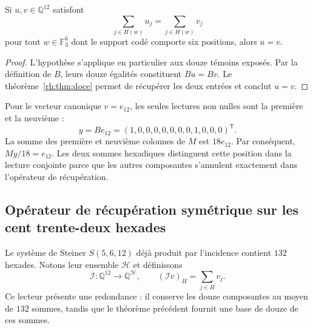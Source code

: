 \begin{corollary}
Si $u,v\in\mathbb Q^{12}$ satisfont
\[
\sum_{j\in H(w)}u_j=\sum_{j\in H(w)}v_j
\]
pour tout $w\in\mathbb F_3^6$ dont le support codé comporte six
positions, alors $u=v$.
\end{corollary}
\begin{proof}
L'hypothèse s'applique en particulier aux douze témoins exposés.
Par la définition de $B$, leurs douze égalités constituent $Bu=Bv$.
Le théorème~\ref{rh:thm:doce} permet de récupérer les deux entrées et
conclut $u=v$.
\end{proof}

\begin{example}
Pour le vecteur canonique $v=e_{12}$, les seules lectures non nulles sont
la première et la neuvième :
\[
y=Be_{12}=(1,0,0,0,0,0,0,0,1,0,0,0)^{\mathsf T}.
\]
La somme des première et neuvième colonnes de $M$ est $18e_{12}$.
Par conséquent, $My/18=e_{12}$. Les deux sommes hexadiques distinguent
cette position dans la lecture conjointe parce que les autres composantes
s'annulent exactement dans l'opérateur de récupération.
\end{example}

\subsection{Opérateur de récupération symétrique sur les cent trente-deux hexades}

Le système de Steiner $S(5,6,12)$ déjà produit par l'incidence
contient $132$ hexades. Notons leur ensemble $\mathcal H$ et
définissons
\[
\mathcal I:\mathbb Q^{12}\longrightarrow\mathbb Q^{\mathcal H},
\qquad
(\mathcal I v)_H=\sum_{j\in H}v_j.
\]
Ce lecteur présente une redondance : il conserve les douze composantes au moyen de
$132$ sommes, tandis que le théorème précédent fournit une base de
douze de ces sommes.

